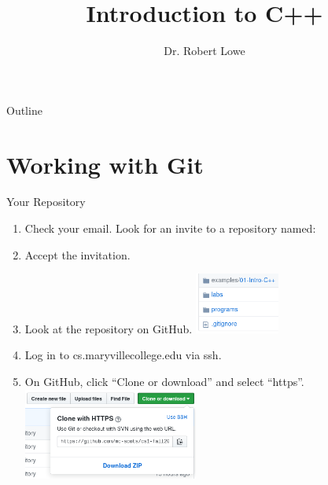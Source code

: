 \documentclass{beamer}
\title{Introduction to C++}
\author{Dr. Robert Lowe\\}
\institute[Maryville College] %
{
  Division of Mathematics and Computer Science\\
  Maryville College
}
\date[]{}
\newcounter{reposteps}
\begin{document}
\begin{frame}
  \titlepage
\end{frame}

\begin{frame}{Outline}
  \tableofcontents
\end{frame}





\section{Working with Git}
\begin{frame}{Your Repository}
\begin{enumerate}[<+->]
    \item Check your email. Look for an invite to a repository named:
    \item Accept the invitation.
    \item Look at the repository on GitHub.
        \newline\includegraphics[height=2cm]{images/cs1-repo}
    \item Log in to cs.maryvillecollege.edu via ssh.
    \item On GitHub, click ``Clone or download'' and select ``https''.
        \newline\includegraphics[height=3cm]{images/cs1-clone}
    \setcounter{reposteps}{\value{enumi}}
\end{enumerate}
\end{frame}
\end{document}
